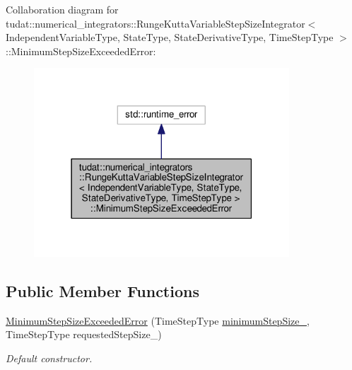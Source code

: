 Collaboration diagram for tudat\+:\+:numerical\+\_\+integrators\+:\+:Runge\+Kutta\+Variable\+Step\+Size\+Integrator$<$ Independent\+Variable\+Type, State\+Type, State\+Derivative\+Type, Time\+Step\+Type $>$\+:\+:Minimum\+Step\+Size\+Exceeded\+Error\+:
\nopagebreak
\begin{figure}[H]
\begin{center}
\leavevmode
\includegraphics[width=271pt]{classtudat_1_1numerical__integrators_1_1RungeKuttaVariableStepSizeIntegrator_1_1MinimumStepSizeExceededError__coll__graph}
\end{center}
\end{figure}
\subsection*{Public Member Functions}
\begin{DoxyCompactItemize}
\item 
\hyperlink{classtudat_1_1numerical__integrators_1_1RungeKuttaVariableStepSizeIntegrator_1_1MinimumStepSizeExceededError_af073ac75f9a5229a1e309d822fd123d0}{Minimum\+Step\+Size\+Exceeded\+Error} (Time\+Step\+Type \hyperlink{classtudat_1_1numerical__integrators_1_1RungeKuttaVariableStepSizeIntegrator_a7055fda3b282fa93820597e2e7ee1f81}{minimum\+Step\+Size\+\_\+}, Time\+Step\+Type requested\+Step\+Size\+\_\+)
\begin{DoxyCompactList}\small\item\em Default constructor. \end{DoxyCompactList}\end{DoxyCompactItemize}
